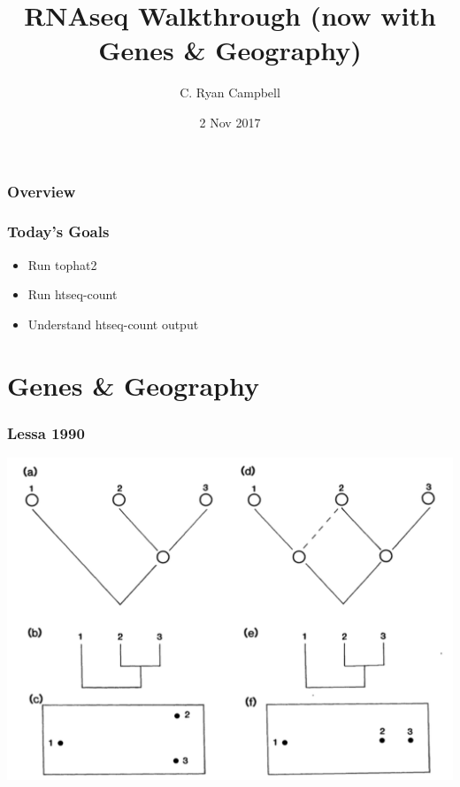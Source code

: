 \documentclass[14pt,handout]{beamer}
\title[RNAseq Practical pt2/3]{RNAseq Walkthrough (now with Genes \& Geography)} %
\author{C. Ryan Campbell} %
\institute[Duke] %
{
Duke University \\ %
\medskip
\textit{c.ryan.campbell@duke.edu} %
}
\date{2 Nov 2017} %
\begin{document}
\begin{frame}
\titlepage %
\end{frame}

\begin{frame}
\frametitle{Overview} %
\tableofcontents %
\end{frame}


\begin{frame}
\frametitle{Today's Goals}
\begin{itemize}
	\item<+-> Run tophat2
	\item<+-> Run htseq-count
	\item<+-> Understand htseq-count output
\end{itemize}
\end{frame}

\section{Genes \& Geography}

\begin{frame}
\frametitle{Lessa 1990}
\begin{center}
		\includegraphics[width=.9\textwidth]{images_20171102_gg01.png}
\end{center}
\end{frame}
\end{document}
